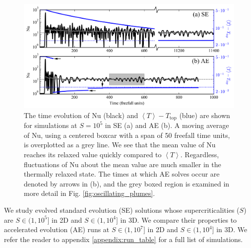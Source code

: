 \documentclass[aps, pre, onecolumn, nofootinbib, notitlepage, groupedaddress, amsfonts, amssymb, amsmath, longbibliography]{revtex4-1}
\newcommand{\angles}[1]{\ensuremath{\left\langle #1 \right\rangle}}
\begin{document}
\begin{figure}[b]
\includegraphics[width=\textwidth]{./figs/nu_v_time.png}
\caption{The time evolution of Nu (black) and $\angles{T} - T_{\text{top}}$ (blue)
are shown for simulations at $S = 10^5$ in SE (a) and AE (b).
A moving average of Nu, using a centered boxcar with a span of 50 freefall time
units, is overplotted as a grey line. 
We see that the mean value of Nu reaches its relaxed value quickly
compared to $\angles{T}$.
Regardless, fluctuations of Nu about the mean
value are much smaller in the thermally relaxed state.
The times at which AE solves occur are denoted by arrows in (b),
and the grey boxed region is examined in more detail in Fig. \ref{fig:oscillating_plumes}.
\label{fig:nu_v_time} }
\end{figure}


We study evolved standard evolution (SE) solutions whose supercriticalities ($S$) are 
$S \in (1, 10^5]$ in 2D and $S \in (1, 10^4]$ in
3D. We compare their properties to
accelerated evolution (AE) runs at $S \in (1, 10^7]$ in 2D and
$S \in (1, 10^4]$ in 3D.
We refer the reader to appendix \ref{appendix:run_table} for a full list of
simulations.
\end{document}
